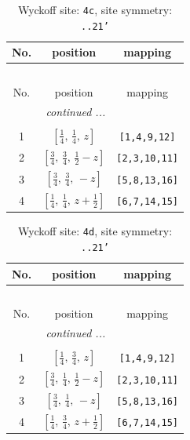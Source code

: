 \documentclass[fleqn,8pt]{jsarticle}
\begin{document}
\renewcommand{\arraystretch}{1.2}
\begin{longtable}{ccc}
\caption{Wyckoff site: {\tt 4c}, site symmetry: {\tt ..21'}}
 \\
 \hline \hline
No. & position & mapping \\ \hline \endfirsthead

\multicolumn{2}{l}{\tablename\ \thetable{}} \\
 \hline \hline
No. & position & mapping \\ \hline \endhead

 \hline \hline
\multicolumn{2}{r}{\footnotesize\it continued ...} \\ \endfoot

 \hline \hline
\multicolumn{2}{r}{} \\ \endlastfoot

1 & $\left[ \frac{1}{4},\, \frac{1}{4},\, z \right]$ & {\tt [1,4,9,12]} \\ \hline
2 & $\left[ \frac{3}{4},\, \frac{3}{4},\, \frac{1}{2} - z \right]$ & {\tt [2,3,10,11]} \\ \hline
3 & $\left[ \frac{3}{4},\, \frac{3}{4},\, - z \right]$ & {\tt [5,8,13,16]} \\ \hline
4 & $\left[ \frac{1}{4},\, \frac{1}{4},\, z + \frac{1}{2} \right]$ & {\tt [6,7,14,15]} \\
\end{longtable}
\renewcommand{\arraystretch}{1.2}
\begin{longtable}{ccc}
\caption{Wyckoff site: {\tt 4d}, site symmetry: {\tt ..21'}}
 \\
 \hline \hline
No. & position & mapping \\ \hline \endfirsthead

\multicolumn{2}{l}{\tablename\ \thetable{}} \\
 \hline \hline
No. & position & mapping \\ \hline \endhead

 \hline \hline
\multicolumn{2}{r}{\footnotesize\it continued ...} \\ \endfoot

 \hline \hline
\multicolumn{2}{r}{} \\ \endlastfoot

1 & $\left[ \frac{1}{4},\, \frac{3}{4},\, z \right]$ & {\tt [1,4,9,12]} \\ \hline
2 & $\left[ \frac{3}{4},\, \frac{1}{4},\, \frac{1}{2} - z \right]$ & {\tt [2,3,10,11]} \\ \hline
3 & $\left[ \frac{3}{4},\, \frac{1}{4},\, - z \right]$ & {\tt [5,8,13,16]} \\ \hline
4 & $\left[ \frac{1}{4},\, \frac{3}{4},\, z + \frac{1}{2} \right]$ & {\tt [6,7,14,15]} \\
\end{longtable}
\end{document}
